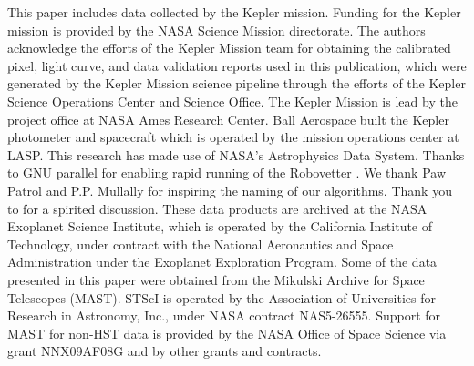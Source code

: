 \documentclass[apj,twocolappendix,numberedappendix]{emulateapj}
\renewcommand{\_}{\discretionary{\underscore}{}{\underscore}}  %
\begin{document}
\acknowledgments
This paper includes data collected by the Kepler mission. Funding for the Kepler mission is provided by the NASA Science Mission directorate. The authors acknowledge the efforts of the Kepler Mission team for obtaining the calibrated pixel, light curve, and data validation reports used in this publication, which were generated by the Kepler Mission science pipeline through the efforts of the Kepler Science Operations Center and Science Office. The Kepler Mission is lead by the project office at NASA Ames Research Center. Ball Aerospace built the Kepler photometer and spacecraft which is operated by the mission operations center at LASP.  This research has made use of NASA's Astrophysics Data System.  Thanks to GNU parallel for enabling rapid running of the Robovetter \citep{Tange2011a}. We thank Paw Patrol and P.P. Mullally for inspiring the naming of our algorithms. Thank you to \citet{Turbo-King2017} for a spirited discussion. These data products are archived at the NASA Exoplanet Science Institute, which is operated by the California Institute of Technology, under contract with the National Aeronautics and Space Administration under the Exoplanet Exploration Program. Some of the data presented in this paper were obtained from the Mikulski Archive for Space Telescopes (MAST). STScI is operated by the Association of Universities for Research in Astronomy, Inc., under NASA contract NAS5-26555. Support for MAST for non-HST data is provided by the NASA Office of Space Science via grant NNX09AF08G and by other grants and contracts.



%



\clearpage
\appendix






\clearpage
\tableofcontents
\end{document}
